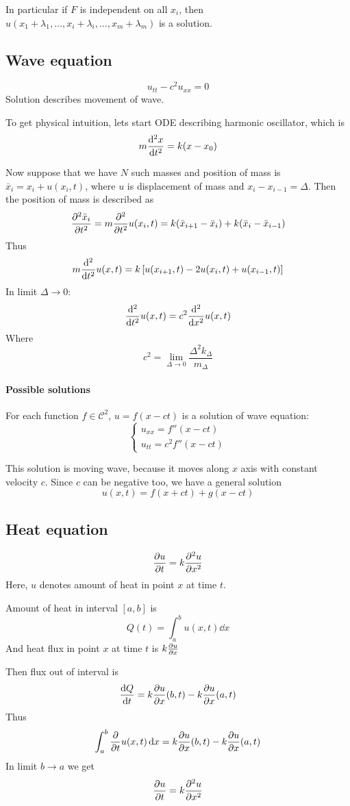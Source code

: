 In particular if $F$ is independent on all $x_i$, then $u(x_1+\lambda_1, \dots, x_i+\lambda_i, \dots, x_m+\lambda_m)$ is a solution.

\subsection{Wave equation}
$$u_{tt} - c^2 u_{xx} = 0$$
Solution describes movement of wave.

To get physical intuition, lets start ODE describing harmonic oscillator, which is
$$m \dv[2]{x}{t} = k(x - x_0)$$

Now suppose that we have $N$ such masses and position of mass is $\bar{x}_i = x_i+u(x_i, t)$, where $u$ is displacement of mass and $x_i - x_{i-1} = \Delta$. Then the position of mass is described as
$$\pdv[2]{\bar{x}_i}{t} = m\pdv[2]{t}u(x_i,t) = k(\bar{x}_{i+1}-\bar{x}_i)+k(\bar{x}_{i}-\bar{x}_{i-1})$$
Thus
$$m\dv[2]{t}u(x,t) = k \left[ u(x_{i+1},t) - 2u(x_i,t) + u(x_{i-1},t) \right]$$
In limit $\Delta \to 0$:
$$\dv[2]{t}u(x,t) = c^2\dv[2]{x}u(x,t)$$
Where
$$c^2 = \lim_{\Delta \to 0} \frac{\Delta^2 k_\Delta}{m_\Delta} $$
\paragraph{Possible solutions}
For each function $f \in \mathcal{C}^2$, $u=f(x-ct)$ is a solution of wave equation:
$$\begin{cases}
u_{xx} = f''(x-ct)\\
u_{tt} = c^2 f''(x-ct)
\end{cases}$$

This solution is moving wave, because it moves along $x$ axis with constant velocity $c$. Since $c$ can be negative too, we have a general solution
$$u(x,t) = f(x+ct) + g(x-ct)$$
\subsection{Heat equation}
$$\pdv{u}{t} = k \pdv[2]{u}{x} $$
Here, $u$ denotes amount of heat in point $x$ at time $t$.

Amount of heat in interval $[a,b]$ is
$$Q(t) = \int_a^b u(x,t) \dd{x}$$
And heat flux in point $x$ at time $t$ is $k\pdv{u}{x}$

Then flux out of interval is
$$\dv{Q}{t} = k\pdv{u}{x} \qty(b,t) - k\pdv{u}{x} \qty(a,t)$$
Thus
$$\int_a^b \pdv{t}u(x,t) \dd{x}  = k\pdv{u}{x}\qty(b,t) - k\pdv{u}{x}\qty(a,t)$$
In limit $b\to a$ we get
$$\pdv{u}{t} = k \pdv[2]{u}{x} $$

